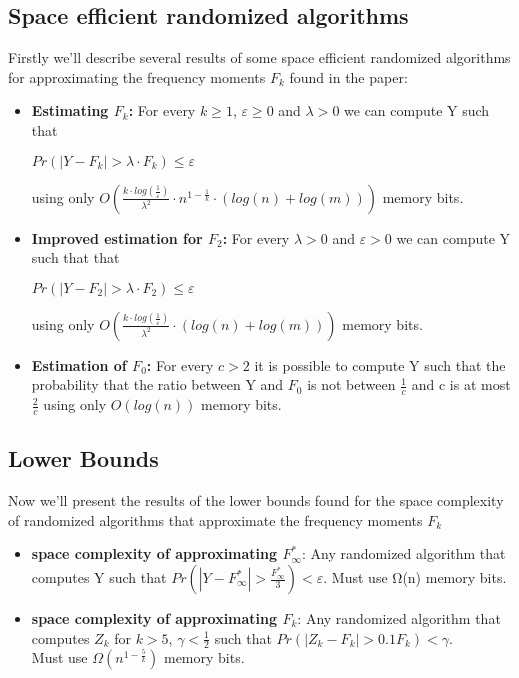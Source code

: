 \documentclass{article}
\begin{document}
\subsection{Space efficient randomized algorithms}

Firstly we'll describe several results of some space efficient randomized algorithms for approximating the frequency moments \(F_{k}\) found in the paper:

\begin{itemize}

\item \textbf{Estimating \(F_{k}\):} 
For every \(k \geq 1\), \(\varepsilon \geq 0\) and \(\lambda > 0\) we can compute Y such that \begin{center}
    \(Pr(\left|Y - F_{k} \right|> \lambda \cdot F_{k}) \leq \varepsilon \)
\end{center}
using only \(O(\frac{k\cdot log(\frac{1}{\varepsilon})}{\lambda ^{2}}\cdot n^{1 - \frac{1}{k}}\cdot (log(n) + log(m)))\) memory bits.\\

\item \textbf{Improved estimation for \(F_{2}\):}
For every \(\lambda > 0\) and \(\varepsilon > 0\) we can compute Y such that
that 
\begin{center}
    \(Pr(\left|Y - F_{2} \right|> \lambda \cdot F_{2}) \leq \varepsilon \)
\end{center}
using only \(O(\frac{k\cdot log(\frac{1}{\varepsilon})}{\lambda ^{2}}\cdot (log(n) + log(m)))\) memory bits.\\
\item \textbf{Estimation of \(F_{0}\):}
For every \(c > 2\) it is possible to compute Y such that the probability that the ratio between Y and \(F_{0}\) is not between \(\frac{1}{c}\) and c is at most \(\frac{2}{c}\)
using only \(O(log(n))\) memory bits.\\
\end{itemize}

\subsection{Lower Bounds}

Now we'll present the results of the lower bounds found  for the space complexity of randomized algorithms that approximate the frequency moments \(F_{k}\)

\begin{itemize}
\item \textbf{space complexity of approximating \(F_{\infty }^{\ast} \)}:
Any randomized algorithm that computes Y such that \(Pr(\left|Y - F_{\infty }^{\ast} \right|> \frac{F_{\infty }^{\ast}}{3}) < \varepsilon\).
Must use Ω(n) memory bits.\\
\item \textbf{space complexity of approximating \(F_{k}\)}:
Any randomized algorithm that computes \(Z_{k}\) for $k > 5$, \(\gamma < \frac{1}{2}\) such that \(Pr(\left|Z_{k} - F_{k} \right|> 0.1F_{k}) < \gamma\).\\
Must use \(\Omega(n^{1-\frac{5}{k}}) \) memory bits.\\
\end{itemize}
\end{document}
